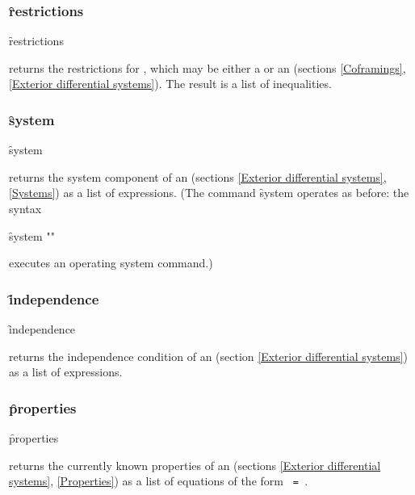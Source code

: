 \subsubsection{\f{restrictions}}
\label{restrictions}

\hypertarget{operator:RESTRICTIONS}{}
\begin{syntax}
	\f{restrictions} 
\end{syntax}
returns the restrictions for , which may be either a
 or an  (sections \ref{Coframings}, \ref{Exterior
differential systems}). The result is a list of inequalities.

\subsubsection{\f{system}}
\label{system}

\hypertarget{operator:EDS_SYSTEM}{}
\begin{syntax}
	\f{system} 
\end{syntax}
returns the system component of an  (sections \ref{Exterior
differential systems}, \ref{Systems}) as a list of 
expressions. (The \REDUCE command \f{system} operates as before:
the syntax
\begin{syntax}
	\f{system} ""
\end{syntax}
executes an operating system command.)

\subsubsection{\f{independence}}
\label{independence}

\hypertarget{operator:INDEPENDENCE}{}
\begin{syntax}
	\f{independence} 
\end{syntax}
returns the independence condition of an  (section \ref{Exterior
differential systems}) as a list of  expressions.


\subsubsection{\f{properties}}
\label{properties}

\hypertarget{operator:PROPERTIES}{}
\begin{syntax}
	\f{properties} 
\end{syntax}
returns the currently known properties of an  (sections
\ref{Exterior differential systems}, \ref{Properties}) as a list of
equations of the form {\tt{} = }.

